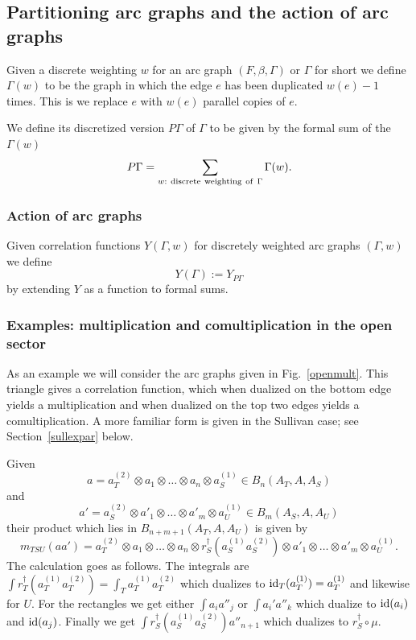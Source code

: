\documentclass[pdftex]{sigma}
\def\oto{\otimes \dots \otimes}
\begin{document}
\subsection{Partitioning arc graphs and the action of arc graphs}
\label{arcgraphactionpar}
Given a discrete  weighting $w$ for an arc graph $(F,\beta,\Gamma)$ or $\Gamma$ for short
we def\/ine  $\Gamma(w)$ to be the graph in which the edge $e$ has been duplicated $w(e)-1$ times.
This is we replace $e$ with $w(e)$ parallel copies of $e$.

We def\/ine  its discretized version $P\Gamma$ of $\Gamma$
to be given by the  formal sum of the $\Gamma(w)$
\begin{equation*}
P\Gamma=\sum_{w: \ {\rm discrete~weighting~of~}\Gamma} \Gamma(w).
\end{equation*}


\subsubsection{Action of arc graphs}
\label{graphactionpar}
Given correlation functions $Y(\Gamma,w)$ for discretely weighted arc graphs $(\Gamma,w)$
we def\/ine
\begin{equation*}
Y(\Gamma):=Y_{P\Gamma}
\end{equation*}
by extending $Y$ as a function to formal sums.

\subsubsection{Examples: multiplication and comultiplication in the  open sector}
As an example we will consider the arc graphs given in Fig.~\ref{openmult}. This triangle gives a correlation function, which
when dualized on the bottom edge yields a multiplication and when
dualized on the top two edges yields a comultiplication. A more
familiar form is given in the Sullivan case; see Section~\ref{sullexpar} below.

Given
\[
a=a^{(2)}_T\otimes a_1\oto a_n\otimes a^{(1)}_S\in B_n(A_T,A,A_S)
\]
and
\[
a'=a_S^{(2)}\otimes a'_1\oto a'_m\otimes a^{(1)}_U\in
B_m(A_S,A,A_U)
\] their product which lies in $B_{n+m+1}(A_T,A,A_U)$
is given by
\begin{equation*}
m_{TSU}(aa') = a_T^{(2)}\otimes a_1\oto a_n\otimes   r^{\dagger}_{S}(a^{(1)}_Sa^{(2)}_S) \otimes a'_1\oto a'_m\otimes a^{(1)}_U.
\end{equation*}
The calculation goes as follows. The integrals are $\int
r^{\dagger}_T (a^{(1)}_T a^{(2)}_T)=\int_T a^{(1)}_T a^{(2)}_T$
which dualizes to ${\rm id}_T(a_T^{(1)})=a_T^{(1)}$ and likewise for $U$.
For the rectangles we get either $\int a_i a''_j$ or $\int a_i'
a''_k$ which dualize to ${\rm id}(a_i)$ and ${\rm id}(a_j)$. Finally we get
$\int r_S^{\dagger}(a_S^{(1)}a_S^{(2)})a''_{n+1}$ which dualizes to
$r_S^{\dagger}\circ \mu$.
\end{document}
